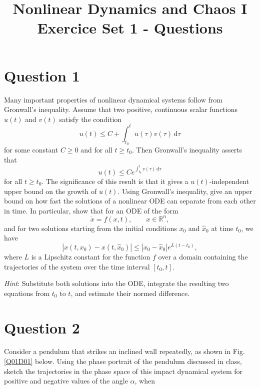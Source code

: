 \documentclass[twoside,10pt,a4paper]{article}
\title{\huge \textbf{Nonlinear Dynamics and Chaos I \\ \Large  Exercice Set 1 - Questions}}	%
\author{ }		%
\date{ }	%
\begin{document}
\maketitle

\section*{Question 1}
Many important properties of nonlinear dynamical systems follow from Gronwall's inequality. Assume that two positive, continuous scalar functions $u(t)$ and $v(t)$ satisfy the condition
\begin{equation*}
	u(t) \leq C + \int_{t_0}^t u(\tau)v(\tau) \, \text{d}\tau
\end{equation*}
for some constant $C \geq 0$ and for all $t \geq t_0$. Then Gronwall's inequality asserts that
\begin{equation*}
u(t) \leq Ce^{\int_{t_0}^t v(\tau) \, \text{d}\tau} 
\end{equation*}
for all $t \geq t_0$. The significance of this result is that it gives a $u(t)$-independent upper bound on the growth of $u(t)$. Using Gronwall's inequality, give an upper bound on how fast the solutions of a nonlinear ODE can separate from each other in time. In particular, show that for an ODE of the form
\begin{equation*}
	\dot{x} = f(x,t), \qquad x \in \mathbb{R}^n,
\end{equation*}
and for two solutions starting from the initial conditions $x_0$ and $\hat{x}_0$ at time $t_0$, we have
\begin{equation*}
	|x(t, x_0) - x(t, \hat{x}_0)| \leq |x_0 - \hat{x}_0|e^{L(t - t_0)},
\end{equation*}
where $L$ is a Lipschitz constant for the function $f$ over a domain containing the trajectories of the system over the time interval $[t_0, t]$.

\textit{Hint}: Substitute both solutions into the ODE, integrate the resulting two equations from $t_0$ to $t$, and estimate their normed difference.

\section*{Question 2}
Consider a pendulum that strikes an inclined wall repeatedly, as shown in Fig. \ref{Q01D01} below. Using the phase portrait of the pendulum discussed in class, sketch the trajectories in the phase space of this impact dynamical system for positive and negative values of the angle $\alpha$, when
\end{document}
